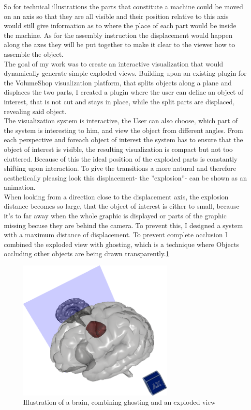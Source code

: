 So for technical illustrations the parts that constitute a machine could be moved on an axis so that they are all visible and their position relative to this axis would still give information as to where the place of each part would be inside the machine. As for the assembly instruction the displacement would happen along the axes they will be put together to make it clear to the viewer how to assemble the object.\\
The goal of my work was to create an interactive visualization that would dynamically generate simple exploded views. Building upon an existing plugin for the VolumeShop visualization platform, that splits objects along a plane and displaces the two parts,  I created a plugin where the user can define an object of interest, that is not cut and stays in place, while the split parts are displaced, revealing said object.\\
The visualization system is interactive, the User can also choose, which part of the system is interesting to him, and view the object from different angles. From each perspective and foreach object of interest the system has to ensure that the object of interest is visible, the resulting visualization is compact but not too cluttered.  Because of this the ideal position of the exploded parts is constantly shifting upon interaction. To give the transitions a more natural and therefore aesthetically pleasing look this displacement- the ''explosion''- can be shown as an animation.\\
When looking from a direction close to the displacement axis, the explosion distance becomes so large, that the object of interest is either to small, because it's to far away when the whole graphic is displayed or parts of the graphic missing becuse they are behind the camera.
To prevent this, I designed a system with a maximum distance of displacement. To prevent complete occlusion I combined the exploded view with ghosting, which is a technique where Objects occluding other objects are being drawn transparently.\ref{fig:demo}\\
\begin{figure}[tb]
	\centering
	\includegraphics[width=0.7\textwidth]{chapters/figures/demo}
	\caption{Illustration of a brain, combining ghosting and an exploded view}
	\label{fig:demo}
\end{figure}